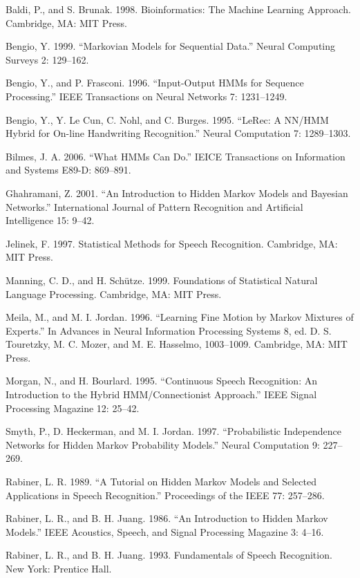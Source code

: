 Baldi, P., and S. Brunak. 1998. Bioinformatics: The Machine Learning Approach. Cambridge, MA: MIT Press.

Bengio, Y. 1999. “Markovian Models for Sequential Data.” Neural Computing Surveys 2: 129--162.

Bengio, Y., and P. Frasconi. 1996. “Input-Output HMMs for Sequence Processing.” IEEE Transactions on Neural Networks 7: 1231--1249.

Bengio, Y., Y. Le Cun, C. Nohl, and C. Burges. 1995. “LeRec: A NN/HMM Hybrid for On-line Handwriting Recognition.” Neural Computation 7: 1289--1303.

Bilmes, J. A. 2006. “What HMMs Can Do.” IEICE Transactions on Information and Systems E89-D: 869--891.

Ghahramani, Z. 2001. “An Introduction to Hidden Markov Models and Bayesian Networks.” International Journal of Pattern Recognition and Artificial Intelligence 15: 9--42.

Jelinek, F. 1997. Statistical Methods for Speech Recognition. Cambridge, MA: MIT Press.

Manning, C. D., and H. Schütze. 1999. Foundations of Statistical Natural Language Processing. Cambridge, MA: MIT Press.

Meila, M., and M. I. Jordan. 1996. “Learning Fine Motion by Markov Mixtures of Experts.” In Advances in Neural Information Processing Systems 8, ed. D. S. Touretzky, M. C. Mozer, and M. E. Hasselmo, 1003--1009. Cambridge, MA: MIT Press.

Morgan, N., and H. Bourlard. 1995. “Continuous Speech Recognition: An Introduction to the Hybrid HMM/Connectionist Approach.” IEEE Signal Processing Magazine 12: 25--42.

Smyth, P., D. Heckerman, and M. I. Jordan. 1997. “Probabilistic Independence Networks for Hidden Markov Probability Models.” Neural Computation 9: 227--269.

Rabiner, L. R. 1989. “A Tutorial on Hidden Markov Models and Selected Applications in Speech Recognition.” Proceedings of the IEEE 77: 257--286.

Rabiner, L. R., and B. H. Juang. 1986. “An Introduction to Hidden Markov Models.” IEEE Acoustics, Speech, and Signal Processing Magazine 3: 4--16.

Rabiner, L. R., and B. H. Juang. 1993. Fundamentals of Speech Recognition. New York: Prentice Hall.
